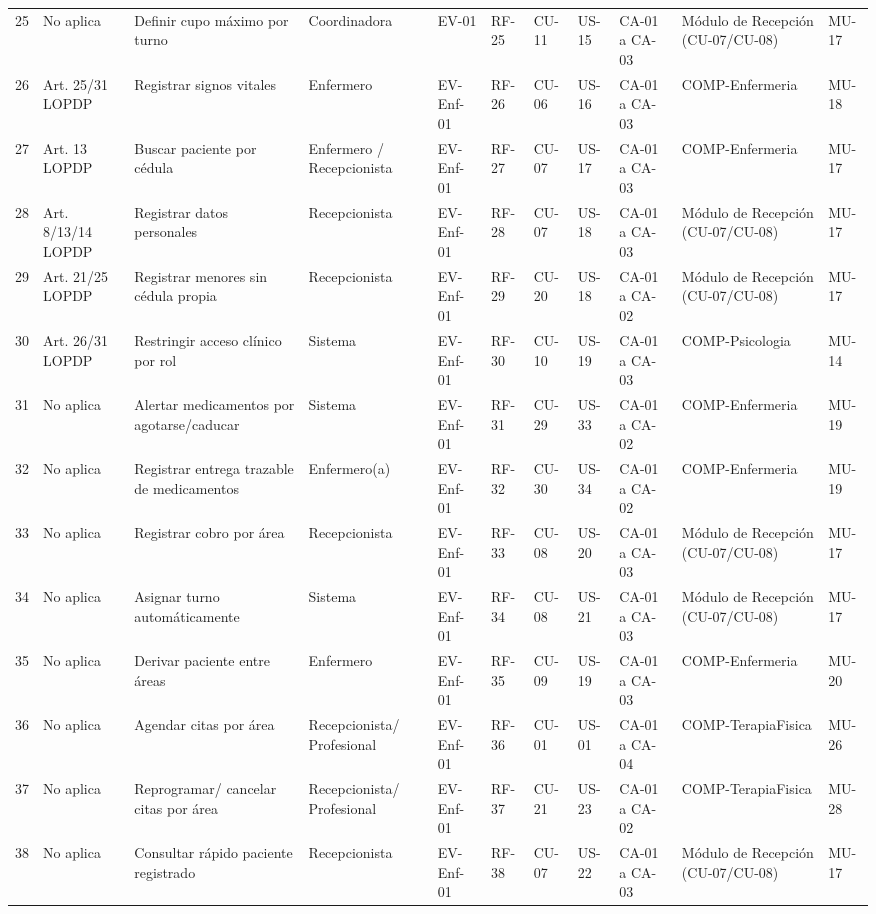 \documentclass[11pt,a4paper]{article}
\begin{document}
\begin{longtable}{p{} p{} p{} p{} p{} p{} p{} p{} p{} p{} p{}}
		25 & No aplica & Definir cupo máximo por turno & Coordinadora & EV-01 & RF-25 & CU-11 & US-15 & CA-01 a CA-03 & Módulo de Recepción (CU-07/CU-08) & MU-17 \\
		26 & Art. 25/31 LOPDP & Registrar signos vitales & Enfermero & EV-Enf-01 & RF-26 & CU-06 & US-16 & CA-01 a CA-03 & COMP-Enfermeria & MU-18 \\
		27 & Art. 13 LOPDP & Buscar paciente por cédula & Enfermero 
		/
		Recepcionista & EV-Enf-01 & RF-27 & CU-07 & US-17 & CA-01 a CA-03 & COMP-Enfermeria & MU-17 \\
		28 & Art. 8/13/14 LOPDP & Registrar datos personales & Recepcionista & EV-Enf-01 & RF-28 & CU-07 & US-18 & CA-01 a CA-03 & Módulo de Recepción (CU-07/CU-08) & MU-17 \\
		29 & Art. 21/25 LOPDP & Registrar menores sin cédula propia & Recepcionista & EV-Enf-01 & RF-29 & CU-20 & US-18 & CA-01 a CA-02 & Módulo de Recepción (CU-07/CU-08) & MU-17 \\
		30 & Art. 26/31 LOPDP & Restringir acceso clínico por rol & Sistema & EV-Enf-01 & RF-30 & CU-10 & US-19 & CA-01 a CA-03 & COMP-Psicologia & MU-14 \\
		31 & No aplica & Alertar medicamentos por agotarse/caducar & Sistema & EV-Enf-01 & RF-31 & CU-29 & US-33 & CA-01 a CA-02 & COMP-Enfermeria & MU-19 \\
		32 & No aplica & Registrar entrega trazable de medicamentos & Enfermero(a) & EV-Enf-01 & RF-32 & CU-30 & US-34 & CA-01 a CA-02 & COMP-Enfermeria & MU-19 \\
		33 & No aplica & Registrar cobro por área & Recepcionista & EV-Enf-01 & RF-33 & CU-08 & US-20 & CA-01 a CA-03 & Módulo de Recepción (CU-07/CU-08) & MU-17 \\
		34 & No aplica & Asignar turno automáticamente & Sistema & EV-Enf-01 & RF-34 & CU-08 & US-21 & CA-01 a CA-03 & Módulo de Recepción (CU-07/CU-08) & MU-17 \\
		35 & No aplica & Derivar paciente entre áreas & Enfermero & EV-Enf-01 & RF-35 & CU-09 & US-19 & CA-01 a CA-03 & COMP-Enfermeria & MU-20  \\
		36 & No aplica & Agendar citas por área & Recepcionista/
		Profesional & EV-Enf-01 & RF-36 & CU-01 & US-01 & CA-01 a CA-04 & COMP-TerapiaFisica & MU-26  \\
		37 & No aplica & Reprogramar/
		cancelar citas por área & Recepcionista/
		Profesional & EV-Enf-01 & RF-37 & CU-21 & US-23 & CA-01 a CA-02 & COMP-TerapiaFisica & MU-28 \\
		38 & No aplica & Consultar rápido paciente registrado & Recepcionista & EV-Enf-01 & RF-38 & CU-07 & US-22 & CA-01 a CA-03 & Módulo de Recepción (CU-07/CU-08) & MU-17 \\

\end{longtable}
\end{document}
